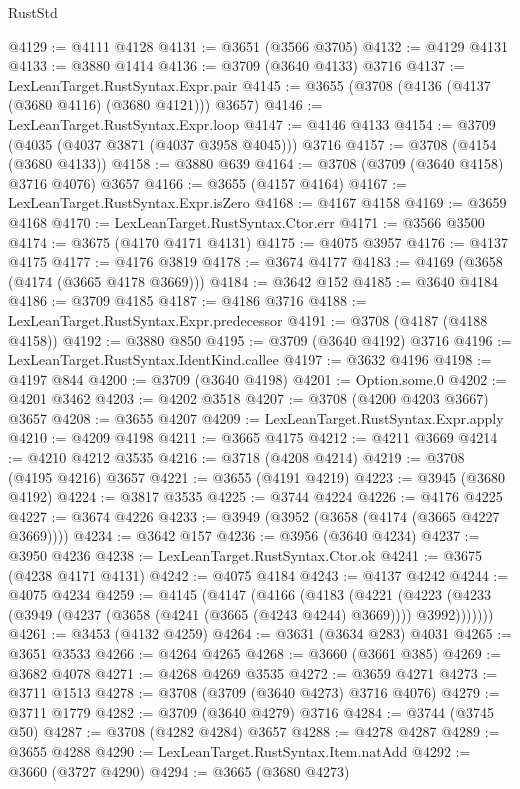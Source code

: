 \begin{lexlean}{RustStd}
\begin{coremodule}
@4129 := @4111 @4128
@4131 := @3651 (@3566 @3705)
@4132 := @4129 @4131
@4133 := @3880 @1414
@4136 := @3709 (@3640 @4133) @3716
@4137 := LexLeanTarget.RustSyntax.Expr.pair
@4145 := @3655 (@3708 (@4136 (@4137 (@3680 @4116) (@3680 @4121))) @3657)
@4146 := LexLeanTarget.RustSyntax.Expr.loop
@4147 := @4146 @4133
@4154 := @3709 (@4035 (@4037 @3871 (@4037 @3958 @4045))) @3716
@4157 := @3708 (@4154 (@3680 @4133))
@4158 := @3880 @639
@4164 := @3708 (@3709 (@3640 @4158) @3716 @4076) @3657
@4166 := @3655 (@4157 @4164)
@4167 := LexLeanTarget.RustSyntax.Expr.isZero
@4168 := @4167 @4158
@4169 := @3659 @4168
@4170 := LexLeanTarget.RustSyntax.Ctor.err
@4171 := @3566 @3500
@4174 := @3675 (@4170 @4171 @4131)
@4175 := @4075 @3957
@4176 := @4137 @4175
@4177 := @4176 @3819
@4178 := @3674 @4177
@4183 := @4169 (@3658 (@4174 (@3665 @4178 @3669)))
@4184 := @3642 @152
@4185 := @3640 @4184
@4186 := @3709 @4185
@4187 := @4186 @3716
@4188 := LexLeanTarget.RustSyntax.Expr.predecessor
@4191 := @3708 (@4187 (@4188 @4158))
@4192 := @3880 @850
@4195 := @3709 (@3640 @4192) @3716
@4196 := LexLeanTarget.RustSyntax.IdentKind.callee
@4197 := @3632 @4196
@4198 := @4197 @844
@4200 := @3709 (@3640 @4198)
@4201 := Option.some.{0}
@4202 := @4201 @3462
@4203 := @4202 @3518
@4207 := @3708 (@4200 @4203 @3667) @3657
@4208 := @3655 @4207
@4209 := LexLeanTarget.RustSyntax.Expr.apply
@4210 := @4209 @4198
@4211 := @3665 @4175
@4212 := @4211 @3669
@4214 := @4210 @4212 @3535
@4216 := @3718 (@4208 @4214)
@4219 := @3708 (@4195 @4216) @3657
@4221 := @3655 (@4191 @4219)
@4223 := @3945 (@3680 @4192)
@4224 := @3817 @3535
@4225 := @3744 @4224
@4226 := @4176 @4225
@4227 := @3674 @4226
@4233 := @3949 (@3952 (@3658 (@4174 (@3665 @4227 @3669))))
@4234 := @3642 @157
@4236 := @3956 (@3640 @4234)
@4237 := @3950 @4236
@4238 := LexLeanTarget.RustSyntax.Ctor.ok
@4241 := @3675 (@4238 @4171 @4131)
@4242 := @4075 @4184
@4243 := @4137 @4242
@4244 := @4075 @4234
@4259 := @4145
    (@4147
      (@4166
        (@4183
          (@4221
            (@4223 (@4233 (@3949 (@4237 (@3658 (@4241 (@3665 (@4243 @4244) @3669)))) @3992)))))))
@4261 := @3453 (@4132 @4259)
@4264 := @3631 (@3634 @283) @4031
@4265 := @3651 @3533
@4266 := @4264 @4265
@4268 := @3660 (@3661 @385)
@4269 := @3682 @4078
@4271 := @4268 @4269 @3535
@4272 := @3659 @4271
@4273 := @3711 @1513
@4278 := @3708 (@3709 (@3640 @4273) @3716 @4076)
@4279 := @3711 @1779
@4282 := @3709 (@3640 @4279) @3716
@4284 := @3744 (@3745 @50)
@4287 := @3708 (@4282 @4284) @3657
@4288 := @4278 @4287
@4289 := @3655 @4288
@4290 := LexLeanTarget.RustSyntax.Item.natAdd
@4292 := @3660 (@3727 @4290)
@4294 := @3665 (@3680 @4273)

\end{coremodule}
\end{lexlean}
